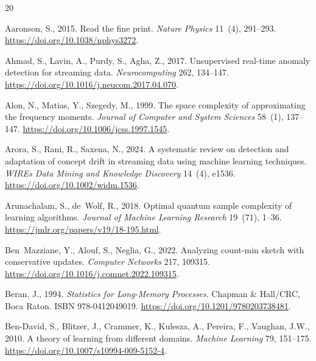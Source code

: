 \documentclass[preprint,12pt,authoryear]{elsarticle}
\begin{document}
\begin{thebibliography}{20}

Aaronson, S., 2015.
\newblock Read the fine print.
\newblock \emph{Nature Physics} 11~(4), 291--293.
\newblock \url{https://doi.org/10.1038/nphys3272}.

Ahmad, S., Lavin, A., Purdy, S., Agha, Z., 2017.
\newblock Unsupervised real-time anomaly detection for streaming data.
\newblock \emph{Neurocomputing} 262, 134--147.
\newblock \url{https://doi.org/10.1016/j.neucom.2017.04.070}.

Alon, N., Matias, Y., Szegedy, M., 1999.
\newblock The space complexity of approximating the frequency moments.
\newblock \emph{Journal of Computer and System Sciences} 58~(1), 137--147.
\newblock \url{https://doi.org/10.1006/jcss.1997.1545}.

Arora, S., Rani, R., Saxena, N., 2024.
\newblock A systematic review on detection and adaptation of concept drift in streaming data using machine learning techniques.
\newblock \emph{WIREs Data Mining and Knowledge Discovery} 14~(4), e1536.
\newblock \url{https://doi.org/10.1002/widm.1536}.

Arunachalam, S., de~Wolf, R., 2018.
\newblock Optimal quantum sample complexity of learning algorithms.
\newblock \emph{Journal of Machine Learning Research} 19~(71), 1--36.
\newblock \url{https://jmlr.org/papers/v19/18-195.html}.

Ben~Mazziane, Y., Alouf, S., Neglia, G., 2022.
\newblock Analyzing count-min sketch with conservative updates.
\newblock \emph{Computer Networks} 217, 109315.
\newblock \url{https://doi.org/10.1016/j.comnet.2022.109315}.

Beran, J., 1994.
\newblock \emph{Statistics for Long-Memory Processes}.
\newblock Chapman \& Hall/CRC, Boca Raton. ISBN 978-0412049019.
\newblock \url{https://doi.org/10.1201/9780203738481}.

Ben-David, S., Blitzer, J., Crammer, K., Kulesza, A., Pereira, F., Vaughan, J.W., 2010.
\newblock A theory of learning from different domains.
\newblock \emph{Machine Learning} 79, 151--175.
\newblock \url{https://doi.org/10.1007/s10994-009-5152-4}.


\end{thebibliography}
\end{document}
